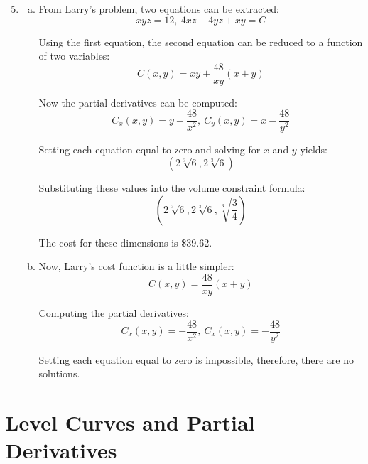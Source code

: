 \documentclass{article}
\begin{document}
\begin{enumerate}[1.]
  \setcounter{enumi}{4}
  \item \begin{enumerate}[a.]
      \item From Larry's problem, two equations can be extracted:
        $$ x y z = 12,\ 4 xz + 4 yz + xy = C $$

        Using the first equation, the second equation can be reduced to a
        function of two variables:
        $$ C(x, y) = xy + \frac{ 48 }{ xy }(x + y) $$

        Now the partial derivatives can be computed:
        $$ C_{x}(x, y) = y - \frac{ 48 }{ x^{2} },\ C_{y}(x, y) = x - \frac{ 48
        }{ y^{2} } $$

        Setting each equation equal to zero and solving for $x$ and $y$ yields:
        $$ \left(2 \sqrt[3]{6}, 2 \sqrt[3]{6}\right) $$

        Substituting these values into the volume constraint formula:
        $$ \left(2 \sqrt[3]{6}, 2 \sqrt[3]{6}, \sqrt[3]{\frac{ 3 }{ 4 }}\right) $$

        The cost for these dimensions is \$39.62.

      \item Now, Larry's cost function is a little simpler:
        $$ C(x, y) = \frac{ 48 }{ xy }(x + y) $$

        Computing the partial derivatives:
        $$ C_{x}(x, y) = -\frac{ 48 }{ x^{2} },\ C_{x}(x, y) = -\frac{ 48 }{
        y^{2} } $$

        Setting each equation equal to zero is impossible, therefore, there are
        no solutions.

    \end{enumerate}
\end{enumerate}

\section{Level Curves and Partial Derivatives}
\end{document}
